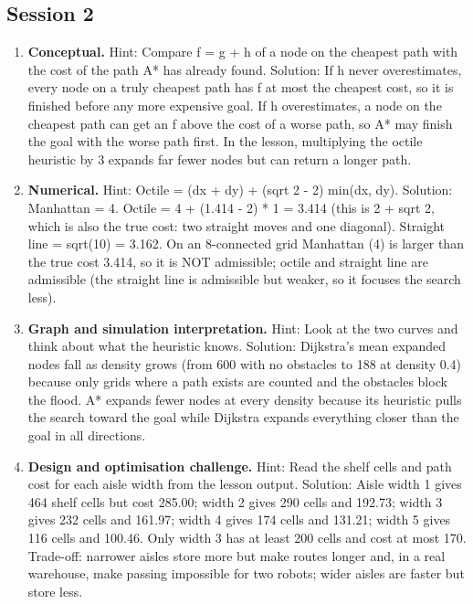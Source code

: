 \documentclass[11pt,a4paper]{article}
\begin{document}
\subsection*{Session 2}
\begin{enumerate}[nosep]
\item \textbf{Conceptual.} Hint: Compare f = g + h of a node on the cheapest path with the cost of the path A* has already found. Solution: If h never overestimates, every node on a truly cheapest path has f at most the cheapest cost, so it is finished before any more expensive goal. If h overestimates, a node on the cheapest path can get an f above the cost of a worse path, so A* may finish the goal with the worse path first. In the lesson, multiplying the octile heuristic by 3 expands far fewer nodes but can return a longer path.
\item \textbf{Numerical.} Hint: Octile = (dx + dy) + (sqrt 2 - 2) min(dx, dy). Solution: Manhattan = 4. Octile = 4 + (1.414 - 2) * 1 = 3.414 (this is 2 + sqrt 2, which is also the true cost: two straight moves and one diagonal). Straight line = sqrt(10) = 3.162. On an 8-connected grid Manhattan (4) is larger than the true cost 3.414, so it is NOT admissible; octile and straight line are admissible (the straight line is admissible but weaker, so it focuses the search less).
\item \textbf{Graph and simulation interpretation.} Hint: Look at the two curves and think about what the heuristic knows. Solution: Dijkstra's mean expanded nodes fall as density grows (from 600 with no obstacles to 188 at density 0.4) because only grids where a path exists are counted and the obstacles block the flood. A* expands fewer nodes at every density because its heuristic pulls the search toward the goal while Dijkstra expands everything closer than the goal in all directions.
\item \textbf{Design and optimisation challenge.} Hint: Read the shelf cells and path cost for each aisle width from the lesson output. Solution: Aisle width 1 gives 464 shelf cells but cost 285.00; width 2 gives 290 cells and 192.73; width 3 gives 232 cells and 161.97; width 4 gives 174 cells and 131.21; width 5 gives 116 cells and 100.46. Only width 3 has at least 200 cells and cost at most 170. Trade-off: narrower aisles store more but make routes longer and, in a real warehouse, make passing impossible for two robots; wider aisles are faster but store less.
\end{enumerate}
\end{document}
